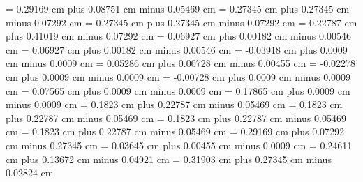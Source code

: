 \gre@interwordspacenotes = 0.29169 cm plus 0.08751 cm minus 0.05469 cm
\gre@interwordspacenotestext = 0.27345 cm plus 0.27345 cm minus 0.07292 cm
\gre@interwordspacetextnotes = 0.27345 cm plus 0.27345 cm minus 0.07292 cm
\gre@interwordspacetext = 0.22787 cm plus 0.41019 cm minus 0.07292 cm
\gre@bitrivirspace = 0.06927 cm plus 0.00182 cm minus 0.00546 cm
\gre@bitristrospace = 0.06927 cm plus 0.00182 cm minus 0.00546 cm
\gre@punctuminclinatumshift= -0.03918 cm plus 0.0009 cm minus 0.0009 cm
\gre@beforepunctainclinatashift= 0.05286 cm plus 0.00728 cm minus 0.00455 cm
\gre@punctuminclinatumanddebilisshift= -0.02278 cm plus 0.0009 cm minus 0.0009 cm
\gre@punctuminclinatumdebilisshift= -0.00728 cm plus 0.0009 cm minus 0.0009 cm
\gre@punctuminclinatumbigshift= 0.07565 cm plus 0.0009 cm minus 0.0009 cm
\gre@punctuminclinatummaxshift= 0.17865 cm plus 0.0009 cm minus 0.0009 cm
\gre@spacearoundsmallbar = 0.1823 cm plus 0.22787 cm minus 0.05469 cm
\gre@spacearoundminor = 0.1823 cm plus 0.22787 cm minus 0.05469 cm
\gre@spacearoundmaior = 0.1823 cm plus 0.22787 cm minus 0.05469 cm
\gre@spacearoundfinalis = 0.1823 cm plus 0.22787 cm minus 0.05469 cm
\gre@spacebeforefinalfinalis= 0.29169 cm plus 0.07292 cm minus 0.27345 cm
\gre@spacearoundclefbars= 0.03645 cm plus 0.00455 cm minus 0.0009 cm
\gre@textbartextspace = 0.24611 cm plus 0.13672 cm minus 0.04921 cm
\gre@notebarspace = 0.31903 cm plus 0.27345 cm minus 0.02824 cm
